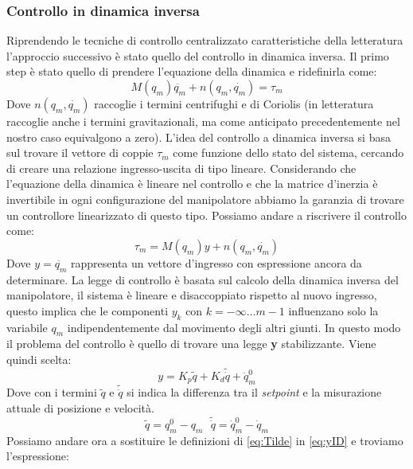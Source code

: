 \subsubsection{Controllo in dinamica inversa}
Riprendendo le tecniche di controllo centralizzato caratteristiche della letteratura l'approccio successivo è stato quello del controllo in dinamica inversa. Il primo step è stato quello di prendere l'equazione della dinamica e ridefinirla come: 
\begin{equation}
M(q_m)\ddot{q_m} + n(q_m,\dot{q_m}) = \tau_m
\label{eq:ControlloreID}
\end{equation}
Dove $n(q_m,\dot{q_m})$ raccoglie i termini centrifughi e di Coriolis (in letteratura raccoglie anche i termini gravitazionali, ma come anticipato precedentemente nel nostro caso equivalgono a zero). L'idea del controllo a dinamica inversa si basa sul trovare il vettore di coppie $\tau_m$ come funzione dello stato del sistema, cercando di creare una relazione ingresso-uscita di tipo lineare. Considerando che l'equazione della dinamica è lineare nel controllo e che la matrice d'inerzia è invertibile in ogni configurazione del manipolatore abbiamo la garanzia di trovare un controllore linearizzato di questo tipo. Possiamo andare a riscrivere il controllo come:
\begin{equation}
\tau_m = M(q_m)y + n(q_m,\dot{q_m})
\end{equation}
Dove $y = \ddot{q_m}$ rappresenta un vettore d'ingresso con espressione ancora da determinare. La legge di controllo è basata sul calcolo della dinamica inversa del manipolatore, il sistema è lineare e disaccoppiato rispetto al nuovo ingresso, questo implica che le componenti $y_k$ con $k = -\infty \dots m-1$ influenzano solo la variabile $q_m$ indipendentemente dal movimento degli altri giunti. In questo modo il problema del controllo è quello di trovare una legge \textbf{y} stabilizzante. Viene quindi scelta:
\begin{equation}
y = K_p\tilde{q} + K_d\tilde{\dot{q}}+\ddot{q}_m^0
\label{eq:yID}
\end{equation}
Dove con i termini $\tilde{q}$ e $\tilde{\dot{q}}$ si indica la differenza tra il \textit{setpoint} e la misurazione attuale di posizione e velocità. 
\begin{equation}
\tilde{q} = q^0_m - q_m \ \ \  \tilde{\dot{q}}= \dot{q}^0_m-\dot{q}_m
\label{eq:Tilde}
\end{equation}
Possiamo andare ora a sostituire le definizioni di \ref{eq:Tilde} in \ref{eq:yID} e troviamo l'espressione:
